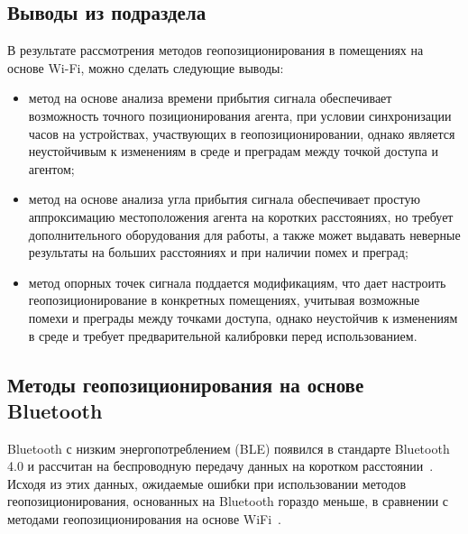 \clearpage

\subsection*{Выводы из подраздела}

В результате рассмотрения методов геопозиционирования в помещениях на основе Wi-Fi, можно сделать следующие выводы:

\begin{itemize}[label=---]
    \item метод на основе анализа времени прибытия сигнала обеспечивает возможность точного позиционирования агента, при условии синхронизации часов на устройствах, участвующих в геопозиционировании, однако является неустойчивым к изменениям в среде и преградам между точкой доступа и агентом;
    \item метод на основе анализа угла прибытия сигнала обеспечивает простую аппроксимацию местоположения агента на коротких расстояниях, но требует дополнительного оборудования для работы, а также может выдавать неверные результаты на больших расстояниях и при наличии помех и преград;
    \item метод опорных точек сигнала поддается модификациям, что дает настроить геопозиционирование в конкретных помещениях, учитывая возможные помехи и преграды между точками доступа, однако неустойчив к изменениям в среде и требует предварительной калибровки перед использованием. 
\end{itemize}

\clearpage

\subsection{Методы геопозиционирования на основе Bluetooth}

Bluetooth с низким энергопотреблением (BLE) появился в стандарте Bluetooth 4.0 и рассчитан на беспроводную передачу данных на коротком расстоянии~\cite{bluetooth}. Исходя из этих данных, ожидаемые ошибки при использовании методов геопозиционирования, основанных на Bluetooth гораздо меньше, в сравнении с методами геопозиционирования на основе WiFi~\cite{blwifi}.


